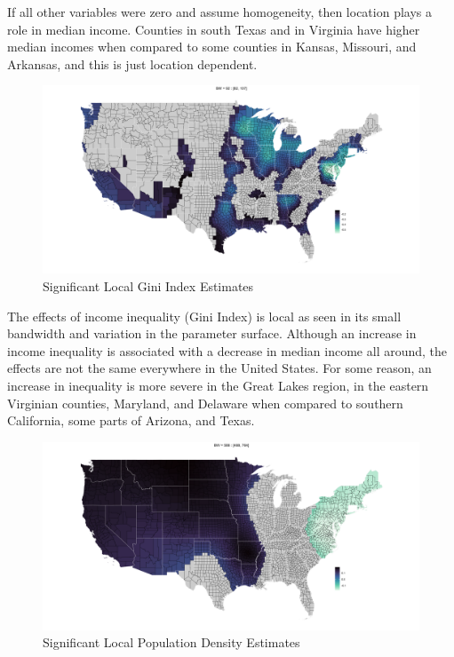 \documentclass[
]{article}
\begin{document}
If all other variables were zero and assume homogeneity, then location
plays a role in median income. Counties in south Texas and in Virginia
have higher median incomes when compared to some counties in Kansas,
Missouri, and Arkansas, and this is just location dependent.

\begin{figure}[H]

{\centering \includegraphics[width=1\linewidth]{images/local-param/sig-gini} 

}

\caption{Significant Local Gini Index Estimates}\label{fig:unnamed-chunk-13}
\end{figure}

The effects of income inequality (Gini Index) is local as seen in its
small bandwidth and variation in the parameter surface. Although an
increase in income inequality is associated with a decrease in median
income all around, the effects are not the same everywhere in the United
States. For some reason, an increase in inequality is more severe in the
Great Lakes region, in the eastern Virginian counties, Maryland, and
Delaware when compared to southern California, some parts of Arizona,
and Texas.

\begin{figure}[H]

{\centering \includegraphics[width=1\linewidth]{images/local-param/sig-ln-pop-den} 

}

\caption{Significant Local Population Density Estimates}\label{fig:unnamed-chunk-14}
\end{figure}
\end{document}
